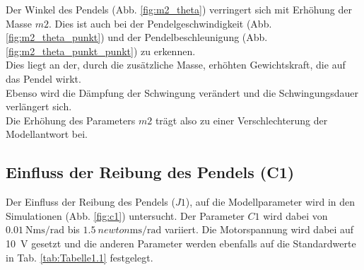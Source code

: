 Der Winkel des Pendels (Abb. \ref{fig:m2_theta}) verringert sich mit Erhöhung der Masse $m2$. 
Dies ist auch bei der Pendelgeschwindigkeit (Abb. \ref{fig:m2_theta_punkt}) und der Pendelbeschleunigung (Abb. \ref{fig:m2_theta_punkt_punkt}) zu erkennen.\\
Dies liegt an der, durch die zusätzliche Masse, erhöhten Gewichtskraft, die auf das Pendel wirkt.\\
Ebenso wird die Dämpfung der Schwingung verändert und die Schwingungsdauer verlängert sich.\\

Die Erhöhung des Parameters $m2$ trägt also zu einer Verschlechterung der Modellantwort bei.

\subsection*{Einfluss der Reibung des Pendels (C1)}
Der Einfluss der Reibung des Pendels ($J1$), auf die Modellparameter wird in den Simulationen (Abb. \ref{fig:c1}) untersucht. 
Der Parameter $C1$ wird dabei von $\SI{0.01}{\newton\meter\second\per\radian}$ bis $\SI{1.5}{newton\meter\second\per\radian}$ variiert.
Die Motorspannung wird dabei auf \SI{10}{\volt} gesetzt und die anderen Parameter werden ebenfalls auf die Standardwerte in Tab. \ref{tab:Tabelle1.1} festgelegt.\\

